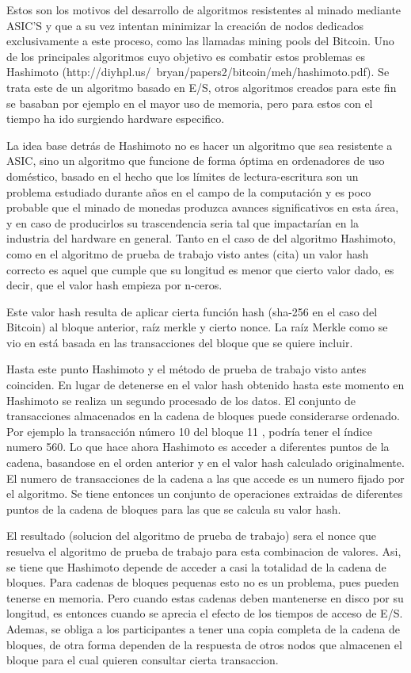 Estos son los motivos del desarrollo de algoritmos resistentes al minado mediante ASIC’S y que a su vez intentan minimizar la creación de nodos dedicados exclusivamente a este proceso, como las llamadas mining pools del Bitcoin. Uno de los principales algoritmos cuyo objetivo es combatir estos problemas es Hashimoto (http://diyhpl.us/~bryan/papers2/bitcoin/meh/hashimoto.pdf). Se trata este de un algoritmo basado en E/S, otros algoritmos creados para este fin se basaban por ejemplo en el mayor uso de memoria, pero para estos con el tiempo ha ido surgiendo hardware especifico.

 La idea base detrás de Hashimoto no es hacer un algoritmo que sea resistente a ASIC, sino un algoritmo que funcione de forma óptima en ordenadores de uso doméstico, basado en el hecho que los límites de lectura-escritura son un problema estudiado durante años en el campo de la computación y es poco probable que el minado de monedas produzca avances significativos en esta área, y en caso de producirlos su trascendencia seria tal que impactarían en la industria del hardware en general.
Tanto en el caso de del algoritmo Hashimoto, como en el algoritmo de prueba de trabajo visto antes (cita) un valor hash correcto es aquel que cumple que su longitud es menor que cierto valor dado, es decir, que el valor hash empieza por n-ceros.

Este valor hash resulta de aplicar cierta función hash (sha-256 en el caso del Bitcoin) al bloque anterior, raíz merkle y cierto nonce. La raíz Merkle como se vio en \label{merkle} está basada en las transacciones del bloque que se quiere incluir. 


Hasta este punto Hashimoto y el método de prueba de trabajo visto antes coinciden. En lugar de detenerse en el valor hash obtenido hasta este momento en Hashimoto se realiza un segundo procesado de los datos. El conjunto de transacciones almacenados en la cadena de bloques puede considerarse ordenado. Por ejemplo la transacción número 10 del bloque 11 , podría tener el índice numero 560. Lo que hace ahora Hashimoto es acceder a diferentes puntos de la cadena, basandose en el orden anterior y en el valor hash calculado originalmente. El numero de transacciones de la cadena a las que accede es un numero fijado por el algoritmo. Se tiene entonces un conjunto de operaciones extraidas de diferentes puntos de la cadena de bloques para las que se calcula su valor hash.


El resultado (solucion del algoritmo de prueba de trabajo) sera el nonce que resuelva el algoritmo de prueba de trabajo para esta combinacion de valores. Asi, se tiene que Hashimoto depende de acceder a casi la totalidad de la cadena de bloques. Para cadenas de bloques pequenas esto no es un problema, pues pueden tenerse en memoria. Pero cuando estas cadenas deben mantenerse en disco por su longitud, es entonces cuando se aprecia el efecto de los tiempos de acceso de E/S. Ademas, se obliga a los participantes a tener una copia completa de la cadena de bloques, de otra forma dependen de la respuesta de otros nodos que almacenen el bloque para el cual quieren consultar cierta transaccion. 

